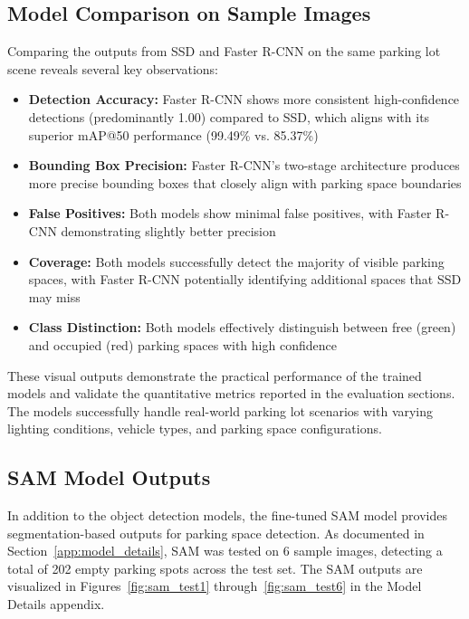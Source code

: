 \documentclass[12pt,a4paper]{article}
\begin{document}
\subsection{Model Comparison on Sample Images}

Comparing the outputs from SSD and Faster R-CNN on the same parking lot scene reveals several key observations:

\begin{itemize}
    \item \textbf{Detection Accuracy:} Faster R-CNN shows more consistent high-confidence detections (predominantly 1.00) compared to SSD, which aligns with its superior mAP@50 performance (99.49\% vs. 85.37\%)
    \item \textbf{Bounding Box Precision:} Faster R-CNN's two-stage architecture produces more precise bounding boxes that closely align with parking space boundaries
    \item \textbf{False Positives:} Both models show minimal false positives, with Faster R-CNN demonstrating slightly better precision
    \item \textbf{Coverage:} Both models successfully detect the majority of visible parking spaces, with Faster R-CNN potentially identifying additional spaces that SSD may miss
    \item \textbf{Class Distinction:} Both models effectively distinguish between free (green) and occupied (red) parking spaces with high confidence
\end{itemize}

These visual outputs demonstrate the practical performance of the trained models and validate the quantitative metrics reported in the evaluation sections. The models successfully handle real-world parking lot scenarios with varying lighting conditions, vehicle types, and parking space configurations.

\subsection{SAM Model Outputs}

In addition to the object detection models, the fine-tuned SAM model provides segmentation-based outputs for parking space detection. As documented in Section~\ref{app:model_details}, SAM was tested on 6 sample images, detecting a total of 202 empty parking spots across the test set. The SAM outputs are visualized in Figures~\ref{fig:sam_test1} through~\ref{fig:sam_test6} in the Model Details appendix.
\end{document}
